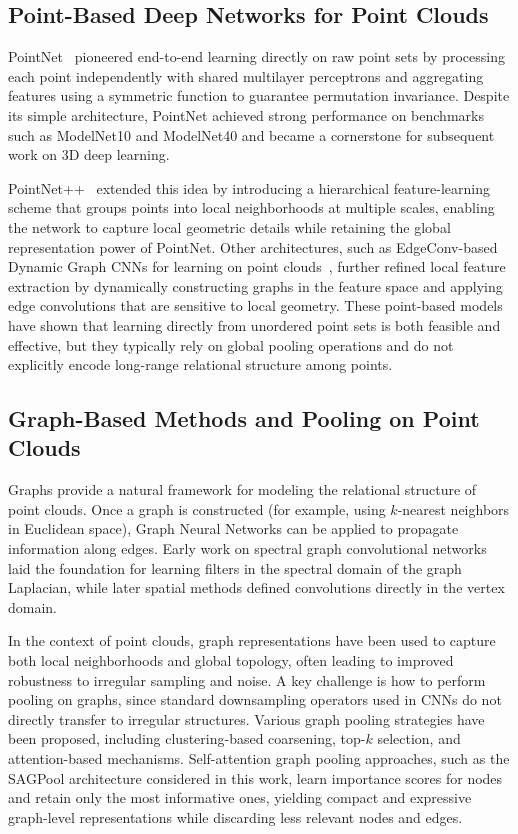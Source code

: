 \documentclass[conference]{IEEEtran}
\begin{document}
\subsection{Point-Based Deep Networks for Point Clouds}

PointNet~\cite{b1} pioneered end-to-end learning directly on raw point sets by
processing each point independently with shared multilayer perceptrons and
aggregating features using a symmetric function to guarantee permutation
invariance. Despite its simple architecture, PointNet achieved strong
performance on benchmarks such as ModelNet10 and ModelNet40 and became a
cornerstone for subsequent work on 3D deep learning.

PointNet++~\cite{b3} extended this idea by introducing a hierarchical
feature-learning scheme that groups points into local neighborhoods at multiple
scales, enabling the network to capture local geometric details while retaining
the global representation power of PointNet. Other architectures, such as
EdgeConv-based Dynamic Graph CNNs for learning on point clouds~\cite{b4}, further
refined local feature extraction by dynamically constructing graphs in the
feature space and applying edge convolutions that are sensitive to local
geometry. These point-based models have shown that learning directly from
unordered point sets is both feasible and effective, but they typically rely on
global pooling operations and do not explicitly encode long-range relational
structure among points.

\subsection{Graph-Based Methods and Pooling on Point Clouds}

Graphs provide a natural framework for modeling the relational structure of
point clouds. Once a graph is constructed (for example, using $k$-nearest
neighbors in Euclidean space), Graph Neural Networks can be applied to propagate
information along edges. Early work on spectral graph convolutional
networks~\cite{b4,b5} laid the foundation for learning filters in the
spectral domain of the graph Laplacian, while later spatial methods defined
convolutions directly in the vertex domain.

In the context of point clouds, graph representations have been used to capture
both local neighborhoods and global topology, often leading to improved
robustness to irregular sampling and noise. A key challenge is how to perform
pooling on graphs, since standard downsampling operators used in CNNs do not
directly transfer to irregular structures. Various graph pooling strategies
have been proposed, including clustering-based coarsening, top-$k$ selection,
and attention-based mechanisms. Self-attention graph pooling approaches, such
as the SAGPool architecture considered in this work, learn importance scores
for nodes and retain only the most informative ones, yielding compact and
expressive graph-level representations while discarding less relevant nodes and
edges.
\end{document}
